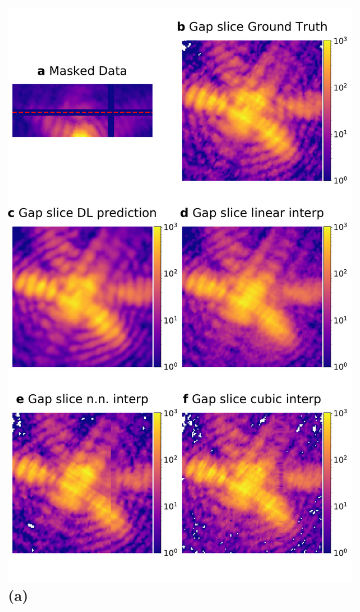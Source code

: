 \begin{figure}[ht]
    \centering
    \begin{subfigure}{0.47\textwidth} 
        \includegraphics[width=\linewidth]{figures/Inpainting/newfig3_suppl.pdf}
        \caption{\textbf{(a)}}
    \end{subfigure}
    \hfill
    \begin{subfigure}{0.47\textwidth}
        \centering

\end{subfigure}
\end{figure}
